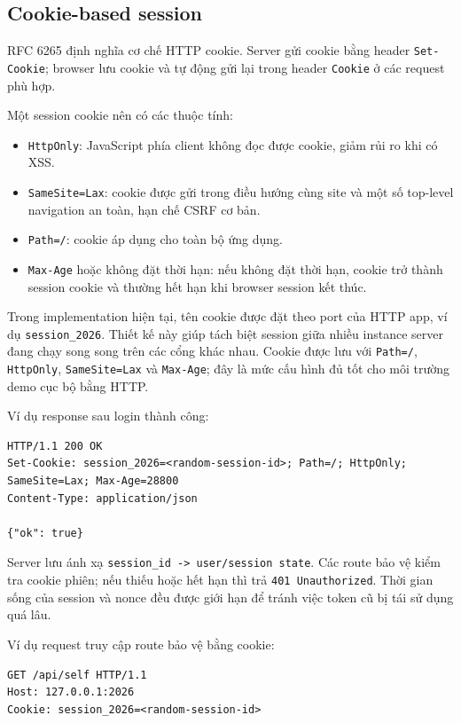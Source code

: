 \subsection{Cookie-based session}
RFC 6265 định nghĩa cơ chế HTTP cookie. Server gửi cookie bằng header \texttt{Set-Cookie}; browser lưu cookie và tự động gửi lại trong header \texttt{Cookie} ở các request phù hợp.

Một session cookie nên có các thuộc tính:
\begin{itemize}[leftmargin=2em]
    \item \texttt{HttpOnly}: JavaScript phía client không đọc được cookie, giảm rủi ro khi có XSS.
    \item \texttt{SameSite=Lax}: cookie được gửi trong điều hướng cùng site và một số top-level navigation an toàn, hạn chế CSRF cơ bản.
    \item \texttt{Path=/}: cookie áp dụng cho toàn bộ ứng dụng.
    \item \texttt{Max-Age} hoặc không đặt thời hạn: nếu không đặt thời hạn, cookie trở thành session cookie và thường hết hạn khi browser session kết thúc.
\end{itemize}

Trong implementation hiện tại, tên cookie được đặt theo port của HTTP app, ví dụ \texttt{session\_2026}. Thiết kế này giúp tách biệt session giữa nhiều instance server đang chạy song song trên các cổng khác nhau. Cookie được lưu với \texttt{Path=/}, \texttt{HttpOnly}, \texttt{SameSite=Lax} và \texttt{Max-Age}; đây là mức cấu hình đủ tốt cho môi trường demo cục bộ bằng HTTP.

Ví dụ response sau login thành công:
\begin{lstlisting}[style=engineering,caption={Set session cookie sau khi xác thực}]
HTTP/1.1 200 OK
Set-Cookie: session_2026=<random-session-id>; Path=/; HttpOnly; SameSite=Lax; Max-Age=28800
Content-Type: application/json

{"ok": true}
\end{lstlisting}

Server lưu ánh xạ \texttt{session\_id -> user/session state}. Các route bảo vệ kiểm tra cookie phiên; nếu thiếu hoặc hết hạn thì trả \texttt{401 Unauthorized}. Thời gian sống của session và nonce đều được giới hạn để tránh việc token cũ bị tái sử dụng quá lâu.

Ví dụ request truy cập route bảo vệ bằng cookie:
\begin{lstlisting}[style=engineering,caption={Request đến route bảo vệ với session cookie}]
GET /api/self HTTP/1.1
Host: 127.0.0.1:2026
Cookie: session_2026=<random-session-id>
\end{lstlisting}

